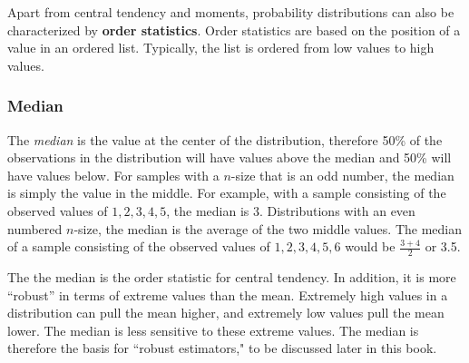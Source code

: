 \documentclass[11pt,openany]{book}\usepackage[]{graphicx}\usepackage[]{color}
\begin{document}
{Apart from central tendency and moments, probability distributions can also be characterized by \textbf{order statistics}. Order statistics are based on the position of a value in an ordered list. Typically, the list is ordered from low values to high values.


\begin{grbox}
\end{grbox}

\subsubsection{Median}

The \textit{median} is the value at the center of the distribution, therefore 50\% of the observations in the distribution will have values above
the median and 50\% will have values below. For samples with a $n$-size that is an odd number, the median is simply the value in the middle. For example, with a sample consisting of the observed values of $1, 2, 3, 4, 5$, the median is $3$. Distributions with an even numbered $n$-size, the median is the average of the two middle values. The median of a sample consisting of the observed values of $1, 2, 3, 4, 5, 6$
would be $\frac{3+4}{2}$ or 3.5. 

The the median is the order statistic for central tendency. In addition, it is more ``robust'' in terms of extreme values than the mean. Extremely high values in a distribution can pull the mean higher, and extremely low values pull the mean lower. The median is less sensitive to these extreme values. The median is therefore the basis for ``robust estimators," to be discussed later in this book.

}
\end{document}
